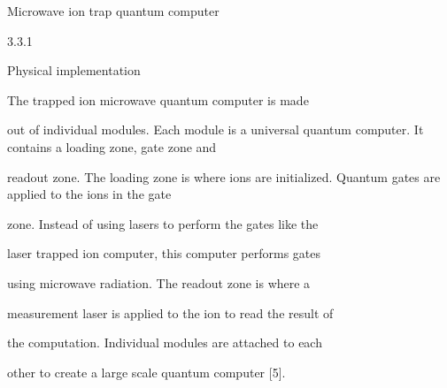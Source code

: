 \documentclass[a4paper,portrait,12pt]{article}
\begin{document}
\begin{flushleft}
Microwave ion trap quantum computer
\end{flushleft}





3.3.1





\begin{flushleft}
Physical implementation
\end{flushleft}





\begin{flushleft}
The trapped ion microwave quantum computer is made
\end{flushleft}


\begin{flushleft}
out of individual modules. Each module is a universal quantum computer. It contains a loading zone, gate zone and
\end{flushleft}


\begin{flushleft}
readout zone. The loading zone is where ions are initialized. Quantum gates are applied to the ions in the gate
\end{flushleft}


\begin{flushleft}
zone. Instead of using lasers to perform the gates like the
\end{flushleft}


\begin{flushleft}
laser trapped ion computer, this computer performs gates
\end{flushleft}


\begin{flushleft}
using microwave radiation. The readout zone is where a
\end{flushleft}


\begin{flushleft}
measurement laser is applied to the ion to read the result of
\end{flushleft}


\begin{flushleft}
the computation. Individual modules are attached to each
\end{flushleft}


\begin{flushleft}
other to create a large scale quantum computer [5].
\end{flushleft}
\end{document}
